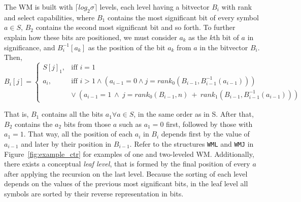 \documentclass[runningheads]{llncs}
\begin{document}
The WM is built with $\lceil log_2\sigma\rceil$ levels, each level having a bitvector $B_i$ with rank and select capabilities, where $B_1$ contains the most significant bit of every symbol $a \in S$, $B_2$ contains the second most significant bit and so forth. To further explain how these bits are positioned, we must consider $a_k$ as the $k$th bit of $a$ in significance, and $B^{-1}_i[a_k]$ as the position of the bit $a_k$ from $a$ in the bitvector $B_i$. Then, 
\[
    B_i[j] = \left\{\begin{array}{lr}
        S[j]_1, & \text{iff } i=1\\
        a_i, & \text{iff } i>1 \wedge (a_{i-1}=0 \wedge j=rank_0(B_{i-1},B^{-1}_{i-1}(a_{i-1}))) \\
        & \vee~(a_{i-1}=1~\wedge~j=rank_0(B_{i-1},n)~+~rank_1(B_{i-1},B^{-1}_{i-1}(a_{i-1})))
        \end{array}\right.
\]

That is, $B_1$ contains all the bits $a_1 \forall a \in S$, in the same order as in S. After that, $B_2$ contains the $a_2$ bits from those $a$ such as $a_1 = 0$ first, followed by those with $a_1 = 1$. That way, all the position of each $a_i$ in $B_i$ depends first by the value of $a_{i-1}$ and later by their position in $B_{i-1}$. Refer to the structures \texttt{WML} and \texttt{WMJ} in Figure~\ref{fig:example_ctr} for examples of one and two-leveled WM. Additionally, there exists a conceptual \textit{leaf level}, that is formed by the final position of every $a$ after applying the recursion on the last level. Because the sorting of each level depends on the values of the previous most significant bits, in the leaf level all symbols are sorted by their reverse representation in bits.
\end{document}
